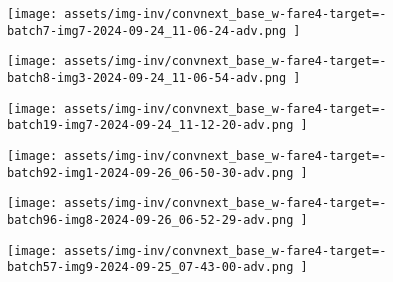 \begin{figure*}[t]
    \vspace{1mm}
    \begin{minipage}[t]{.025\textwidth}
         \vspace{9mm}
    \end{minipage}%
    \begin{minipage}[t]{.98\textwidth}
        \vspace{0pt}
            \begin{subfigure}[t]{0.16\textwidth}
                    \texttt{[image:  assets/img-inv/convnext\_base\_w-fare4-target=-batch7-img7-2024-09-24\_11-06-24-adv.png ]}
            \end{subfigure}%
                \hspace{0.5mm}%
            \begin{subfigure}[t]{0.16\textwidth}
                    \texttt{[image:  assets/img-inv/convnext\_base\_w-fare4-target=-batch8-img3-2024-09-24\_11-06-54-adv.png ]}
            \end{subfigure}%
                \hspace{0.5mm}%
            \begin{subfigure}[t]{0.16\textwidth}
                    \texttt{[image:  assets/img-inv/convnext\_base\_w-fare4-target=-batch19-img7-2024-09-24\_11-12-20-adv.png ]}
            \end{subfigure}%
                \hspace{0.5mm}%
            \begin{subfigure}[t]{0.16\textwidth}
                    \texttt{[image:  assets/img-inv/convnext\_base\_w-fare4-target=-batch92-img1-2024-09-26\_06-50-30-adv.png ]}
            \end{subfigure}%
                \hspace{0.5mm}%
            \begin{subfigure}[t]{0.16\textwidth}
                    \texttt{[image:  assets/img-inv/convnext\_base\_w-fare4-target=-batch96-img8-2024-09-26\_06-52-29-adv.png ]}
            \end{subfigure}%
                \hspace{0.5mm}%
            \begin{subfigure}[t]{0.16\textwidth}
                    \texttt{[image:  assets/img-inv/convnext\_base\_w-fare4-target=-batch57-img9-2024-09-25\_07-43-00-adv.png ]}
            \end{subfigure}%
    \end{minipage}


\end{figure*}
